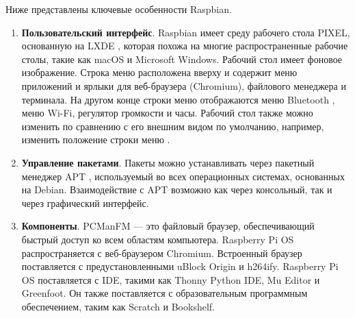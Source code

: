 Ниже представлены ключевые особенности Raspbian.
\begin{enumerate}[label*=\arabic*.]
	\item \textbf{Пользовательский интерфейс}. \newline
	Raspbian имеет среду рабочего стола PIXEL, основанную на LXDE \cite{LXDE}, которая похожа на многие распространенные рабочие столы, такие как macOS и Microsoft Windows. Рабочий стол имеет фоновое изображение. Строка меню расположена вверху и содержит меню приложений и ярлыки для веб-браузера (Chromium), файлового менеджера и терминала. На другом конце строки меню отображаются меню Bluetooth , меню Wi-Fi, регулятор громкости и часы. Рабочий стол также можно изменить по сравнению с его внешним видом по умолчанию, например, изменить положение строки меню \cite{Raspbian_customize}.
	
	\item \textbf{Управление пакетами}. \newline
	Пакеты можно устанавливать через пакетный менеджер APT \cite{APT}, используемый во всех операционных системах, основанных на Debian. Взаимодействие с APT возможно как через консольный, так и через графический интерфейс.
	
	\item \textbf{Компоненты}.
	\subitem PCManFM — это файловый браузер, обеспечивающий быстрый доступ ко всем областям компьютера.
	\subitem Raspberry Pi OS распространяется с веб-браузером Chromium. Встроенный браузер поставляется с предустановленными uBlock Origin и h264ify.
	\subitem Raspberry Pi OS поставляется с IDE, такими как Thonny Python IDE, Mu Editor и Greenfoot. Он также поставляется с образовательным программным обеспечением, таким как Scratch и Bookshelf.
	
\end{enumerate}

\pagebreak